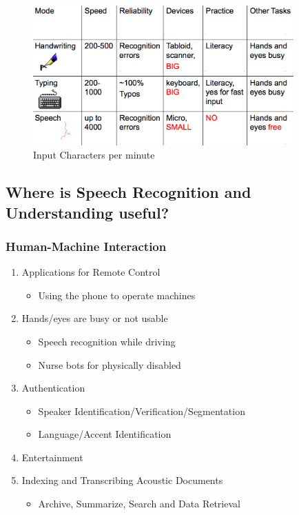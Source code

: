 \begin{figure}[ht]
\centering
\includegraphics[width=10cm]{images/Input.png}
\caption{Input Characters per minute}
\label{fig:inputCharacters}
\end{figure}

\subsection{Where is Speech Recognition and Understanding useful?}
\subsubsection{Human-Machine Interaction}
\begin{enumerate}
\item Applications for Remote Control
\begin{itemize}
\item Using the phone to operate machines
\end{itemize}

\item Hands/eyes are busy or not usable
\begin{itemize}
\item Speech recognition while driving
\item Nurse bots for physically disabled
\end{itemize}

\item Authentication
\begin{itemize}
\item Speaker Identification/Verification/Segmentation
\item Language/Accent Identification
\end{itemize}

\item Entertainment

\item Indexing and Transcribing Acoustic Documents
\begin{itemize}
\item Archive, Summarize, Search and Data Retrieval
\end{itemize}

\end{enumerate}

